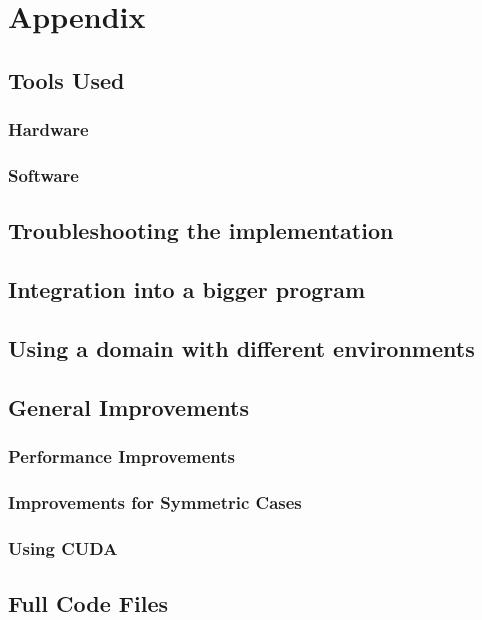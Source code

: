 
\chapter{Appendix} %

\label{AppendixA} %

\section{Tools Used}
\subsection{Hardware}
\subsection{Software}

\section{Troubleshooting the implementation}

\section{Integration into a bigger program}

\section{Using a domain with different environments}

\section{General Improvements}
\subsection{Performance Improvements}
\subsection{Improvements for Symmetric Cases}
\subsection{Using CUDA}


\section{Full Code Files}
